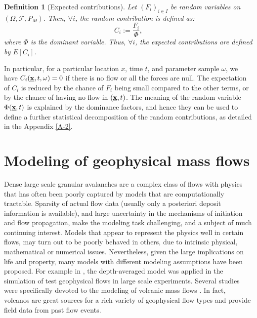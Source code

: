 \documentclass{article}
\newtheorem{definition}[theorem]{Definition}
\begin{document}
\begin{definition}[Expected contributions]
Let $(F_i)_{i\in I}$ be random variables on $(\Omega, \mathcal F, P_M)$. Then, $\forall i$, the random contribution is defined as:
$$C_i:=\frac{F_i}{\Phi},$$
where $\Phi$ is the dominant variable. Thus, $\forall i$, the expected contributions are defined by $E\left[C_i\right]$.
\end{definition}

In particular, for a particular location $x$, time $t$, and parameter sample $\omega$, we have $C_i(\underline{\textbf x},t,\omega)=0$ if there is no flow or all the forces are null. The expectation of $C_i$ is reduced by the chance of $F_i$ being small compared to the other terms, or by the chance of having no flow in $(\underline{\textbf x},t)$. The meaning of the random variable $\Phi(\underline{\textbf x},t)$ is explained by the dominance factors, and hence they can be used to define a further statistical decomposition of the random contributions, as detailed in the Appendix \ref{A-2}.


\section{Modeling of geophysical mass flows}\label{subsec:FlowTypes}
Dense large scale granular avalanches are a complex class of flows with physics that has often been poorly captured by models that are computationally tractable. Sparsity of actual flow data (usually only a posteriori deposit information is available), and large uncertainty in the mechanisms of initiation and flow propagation, make the modeling task challenging, and a subject of much continuing interest. Models that appear to represent the physics well in certain flows, may turn out to be poorly behaved in others, due to intrinsic physical, mathematical or numerical issues. Nevertheless, given the large implications on life and property, many models with different modeling assumptions have been proposed. For example in \citep{Iverson1997, Iverson2001, Denlinger2001, Pitman2003a, Denlinger2004, Iverson2004}, the depth-averaged model was applied in the simulation of test geophysical flows in large scale experiments. Several studies were specifically devoted to the modeling of volcanic mass flows \citep{Bursik2005,Kelfoun2005,Charbonnier2009,Kelfoun2009,Procter2010,Kelfoun2011,Charbonnier2013}. In fact, volcanos are great sources for a rich variety of geophysical flow types and provide field data from past flow events.
\end{document}
